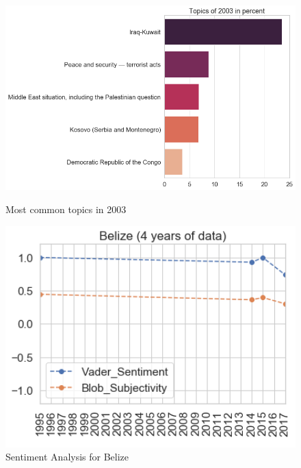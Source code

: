 \begin{figure}[t]
  \centering
  \includegraphics[width=13cm]{img/2003_most_common_topics.png}
  \caption{Most common topics in 2003}
  \label{common_3}
    \centering
    \vspace{10pt}
    \begin{minipage}{0.47\textwidth}
        \centering
        \includegraphics[width=1.1\textwidth]{img/Belize_average.png} %
        \caption{Sentiment Analysis for Belize}
        \label{belize}
    \end{minipage}\hfill
    \begin{minipage}{0.47\textwidth}
        \centering

\end{minipage}
\end{figure}

